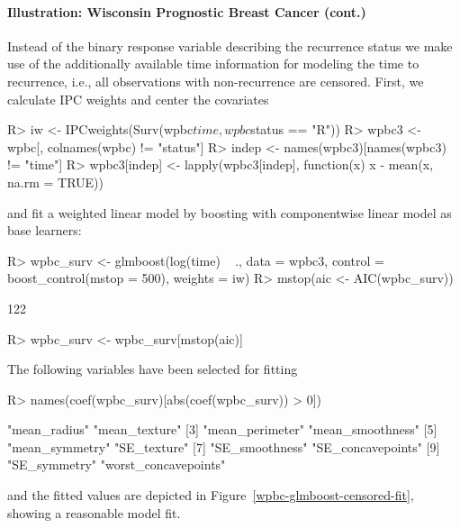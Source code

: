 \documentclass{article}
\newenvironment{Schunk}{}{}
\begin{document}
\paragraph{Illustration: Wisconsin Prognostic Breast Cancer (cont.)}         


Instead of the binary response variable describing the recurrence status we
make use of the additionally available time information for modeling
the time to recurrence, i.e., all observations with non-recurrence are censored.
First, we calculate IPC weights and center the covariates
\begin{Schunk}
\begin{Sinput}
R> iw <- IPCweights(Surv(wpbc$time, wpbc$status == 
         "R"))
R> wpbc3 <- wpbc[, colnames(wpbc) != "status"]
R> indep <- names(wpbc3)[names(wpbc3) != "time"]
R> wpbc3[indep] <- lapply(wpbc3[indep], function(x) x - 
         mean(x, na.rm = TRUE))
\end{Sinput}
\end{Schunk}
and fit a weighted linear model by boosting with componentwise linear model as base learners:
\begin{Schunk}
\begin{Sinput}
R> wpbc_surv <- glmboost(log(time) ~ ., data = wpbc3, 
         control = boost_control(mstop = 500), weights = iw)
R> mstop(aic <- AIC(wpbc_surv))
\end{Sinput}
\begin{Soutput}
[1] 122
\end{Soutput}
\begin{Sinput}
R> wpbc_surv <- wpbc_surv[mstop(aic)]
\end{Sinput}
\end{Schunk}
The following variables have been selected for fitting 
\begin{Schunk}
\begin{Sinput}
R> names(coef(wpbc_surv)[abs(coef(wpbc_surv)) > 0])
\end{Sinput}
\begin{Soutput}
 [1] "mean_radius"         "mean_texture"       
 [3] "mean_perimeter"      "mean_smoothness"    
 [5] "mean_symmetry"       "SE_texture"         
 [7] "SE_smoothness"       "SE_concavepoints"   
 [9] "SE_symmetry"         "worst_concavepoints"
\end{Soutput}
\end{Schunk}
and the fitted values are 
depicted in Figure~\ref{wpbc-glmboost-censored-fit}, showing a reasonable model fit.
\end{document}
